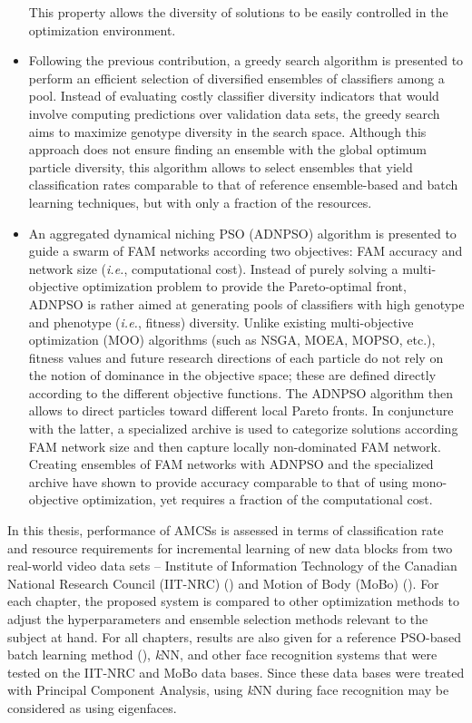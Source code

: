 \begin{itemize}
This property allows the diversity of solutions to be easily controlled in the optimization environment.
	\item Following the previous contribution, a greedy search algorithm is presented to perform an efficient selection of diversified ensembles of classifiers among a pool.
Instead of evaluating costly classifier diversity indicators that would involve computing predictions over validation data sets, the greedy search aims to maximize genotype diversity in the search space.
Although this approach does not ensure finding an ensemble with the global optimum particle diversity, this algorithm allows to select ensembles that yield classification rates comparable to that of reference ensemble-based and batch learning techniques, but with only a fraction of the resources.
	\item An aggregated dynamical niching PSO (ADNPSO) algorithm is presented to guide a swarm of FAM networks according two objectives: FAM accuracy and network size (\emph{i.e.}, computational cost).
Instead of purely solving a multi-objective optimization problem to provide the Pareto-optimal front, ADNPSO is rather aimed at generating pools of classifiers with high genotype and phenotype (\emph{i.e.}, fitness) diversity.
Unlike existing multi-objective optimization (MOO) algorithms (such as NSGA, MOEA, MOPSO, etc.), fitness values and future research directions of each particle do not rely on the notion of dominance in the objective space;
these are defined directly according to the different objective functions.
The ADNPSO algorithm then allows to direct particles toward different local Pareto fronts.
In conjuncture with the latter, a specialized archive is used to categorize solutions according FAM network size and then capture locally non-dominated FAM network.
Creating ensembles of FAM networks with ADNPSO and the specialized archive have shown to provide accuracy comparable to that of using mono-objective optimization, yet requires a fraction of the computational cost.
\end{itemize}

In this thesis, performance of AMCSs is assessed in terms of classification rate and resource requirements for incremental learning of new data blocks from two real-world video data sets -- Institute of Information Technology of the Canadian National Research Council (IIT-NRC) (\cite{gorodnichy05}) and Motion of Body (MoBo) (\cite{gross02}).
For each chapter, the proposed system is compared to other optimization methods to adjust the hyperparameters and ensemble selection methods relevant to the subject at hand.
For all chapters, results are also given for a reference PSO-based batch learning method (\citep{granger07}), \textit{k}NN, and other face recognition systems that were tested on the IIT-NRC and MoBo data bases. 
Since these data bases were treated with Principal Component Analysis, using \textit{k}NN during face recognition may be considered as using eigenfaces.

